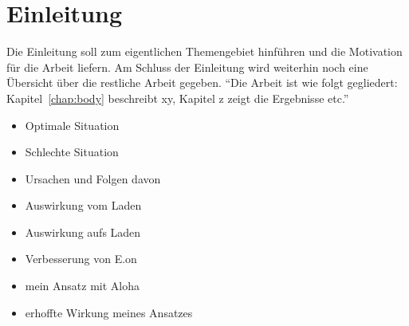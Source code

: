 \chapter{Einleitung}

Die Einleitung soll zum eigentlichen Themengebiet hinführen und die
Motivation für die Arbeit liefern. Am Schluss der Einleitung wird
weiterhin noch eine Übersicht über die restliche Arbeit gegeben.
``Die Arbeit ist wie folgt gegliedert: Kapitel~\ref{chap:body} beschreibt xy, Kapitel z zeigt die Ergebnisse etc.''

\begin{itemize}
\item Optimale Situation
\item Schlechte Situation
\item Ursachen und Folgen davon
\item Auswirkung vom Laden
\item Auswirkung aufs Laden
\item Verbesserung von E.on
\item mein Ansatz mit Aloha
\item erhoffte Wirkung meines Ansatzes
\end{itemize}
